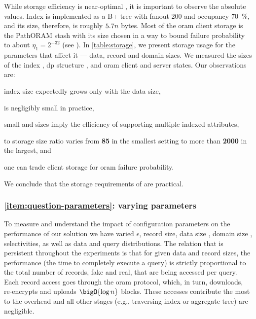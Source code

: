 			While \epsolute{} storage efficiency is near-optimal , it is important to observe the absolute values.
			Index \indexI{} is implemented as a B+ tree with fanout 200 and occupancy \SI{70}{\percent}, and its size, therefore, is roughly $5.7 n$ bytes.
			Most of the \acrshort{oram} client storage is the PathORAM stash with its size chosen in a way to bound failure probability to about $\eta_1 = 2^{-32}$ (see \cite[Theorem 1]{path-oram}). %
			In \cref{table:storage}, we present \epsolute{} storage usage for the parameters that affect it --- data, record and domain sizes.
			We measured the sizes of the index \indexI{}, \acrshort{dp} structure \serverDS{}, and \acrshort{oram} client and server states.
			Our observations are:
			\begin{enumerate*}[label={(\roman*)}]
				\item index size expectedly grows only with the data size,
				\item \serverDS{} is negligibly small in practice,
				\item small \indexI{} and \serverDS{} sizes imply the efficiency of supporting multiple indexed attributes,
				\item \server{} to \user{} storage size ratio varies from \textbf{85} in the smallest setting to more than \textbf{\num[detect-all=true]{2000}} in the largest, and
				\item one can trade client storage for \acrshort{oram} failure probability.
			\end{enumerate*}
			We conclude that the storage requirements of \epsolute{} are practical.



		\subsubsection*{\textbf{\texorpdfstring{\ref{item:question-parameters}:}{} varying parameters}}

			

			To measure and understand the impact of configuration parameters on the performance of our solution we have varied $\epsilon$, record size, data size \dataSize{}, domain size \domainSize{}, selectivities, as well as data and query distributions.
			The relation that is persistent throughout the experiments is that for given data and record sizes, the performance (the time to completely execute a query) is strictly proportional to the total number of records, fake and real, that are being accessed per query.
			Each record access goes through the \acrshort{oram} protocol, which, in turn, downloads, re-encrypts and uploads $\bigO{\log{\dataSize}}$ blocks.
			These accesses contribute the most to the overhead and all other stages (e.g., traversing index or aggregate tree) are negligible.

